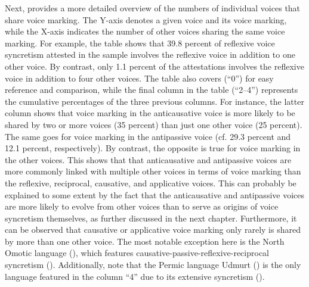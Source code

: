 Next,  provides a more detailed overview of the numbers of individual voices that share voice marking. The Y-axis denotes a given voice and its voice marking, while the X-axis indicates the number of other voices sharing the same voice marking. For example, the table shows that 39.8 percent of reflexive voice syncretism attested in the sample involves the reflexive voice in addition to one other voice. By contrast, only 1.1 percent of the attestations involves the reflexive voice in addition to four other voices. The table also covers  (“0”) for easy reference and comparison, while the final column in the table (“2–4”) represents the cumulative percentages of the three previous columns. For instance, the latter column shows that voice marking in the anticausative voice is more likely to be shared by two or more voices (35 percent) than just one other voice (25 percent). The same goes for voice marking in the antipassive voice (cf. 29.3 percent and 12.1 percent, respectively). By contrast, the opposite is true for voice marking in the other voices. This shows that that anticausative and antipassive voices are more commonly linked with multiple other voices in terms of voice marking than the reflexive, reciprocal, causative, and applicative voices. This can probably be explained to some extent by the fact that the anticausative and antipassive voices are more likely to evolve from other voices than to serve as origins of voice syncretism themselves, as further discussed in the next chapter. Furthermore, it can be observed that causative or applicative voice marking only rarely is shared by more than one other voice. The most notable exception here is the North Omotic language  (), which features causative-passive-reflexive-reciprocal syncretism (). Additionally, note that the Permic language Udmurt () is the only language featured in the column “4” due to its extensive syncretism (). 

